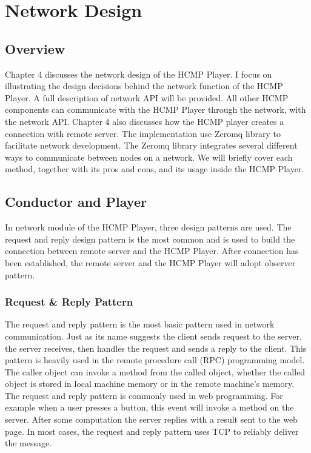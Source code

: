 
\chapter{Network Design}

\section{Overview}

Chapter 4 discusses the network design of the HCMP Player.  
I focus on illustrating the design decisions behind the network function of    
the HCMP Player. A full description of network API will be provided. All other
HCMP components can communicate with the HCMP Player through the network,
with the network API. Chapter 4 also discusses how the HCMP player 
creates a connection with remote server. The implementation 
use Zeromq library to facilitate network development. The Zeromq library 
integrates several different ways to communicate between nodes on a network.
We will briefly cover each method, together with its pros and cons, and 
its usage inside the HCMP Player.

\section{Conductor and Player}
In network module of the HCMP Player, three design patterns are used. The 
request and reply design pattern is the most common and is used to 
build the connection between remote server and the HCMP Player. 
After connection has been established, the remote server and
the HCMP Player will adopt observer pattern. 

\subsection{Request \& Reply Pattern}
The request and reply pattern is the most basic pattern used in network 
communication. Just as its name suggests the client sends request to the server,
the server receives, then handles the request and sends a reply to
the client. This pattern is heavily used in the remote procedure call (RPC) 
programming model. The caller object can invoke a method from the called 
object, whether the called object is stored in local machine memory or
in the remote machine's memory. The request and reply pattern is commonly used
in web programming. For example when a user presses a button, this event will 
invoke a method on the server. After some computation the server replies with 
a result sent to the web page. In most cases, the request and reply pattern
uses TCP to reliably deliver the message. 


